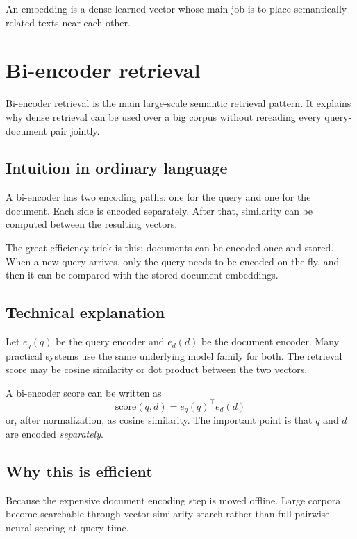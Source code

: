 \documentclass[11pt,oneside]{report}
\begin{document}
\begin{rememberbox}
An embedding is a dense learned vector whose main job is to place semantically related texts near each other.
\end{rememberbox}


\chapter[Bi-Encoder Retrieval]{Bi-encoder retrieval}

\begin{purposebox}
Bi-encoder retrieval is the main large-scale semantic retrieval pattern. It explains why dense retrieval can be used over a big corpus without rereading every query-document pair jointly.
\end{purposebox}

\section*{Intuition in ordinary language}
A bi-encoder has two encoding paths: one for the query and one for the document. Each side is encoded separately. After that, similarity can be computed between the resulting vectors.

\begin{intuitionbox}
The great efficiency trick is this: documents can be encoded once and stored. When a new query arrives, only the query needs to be encoded on the fly, and then it can be compared with the stored document embeddings.
\end{intuitionbox}

\section*{Technical explanation}
Let $e_q(q)$ be the query encoder and $e_d(d)$ be the document encoder. Many practical systems use the same underlying model family for both. The retrieval score may be cosine similarity or dot product between the two vectors.

\begin{formulabox}
A bi-encoder score can be written as
\[
\mathrm{score}(q,d)=e_q(q)^\top e_d(d)
\]
or, after normalization, as cosine similarity. The important point is that $q$ and $d$ are encoded \emph{separately}.
\end{formulabox}

\section*{Why this is efficient}
Because the expensive document encoding step is moved offline. Large corpora become searchable through vector similarity search rather than full pairwise neural scoring at query time.
\end{document}

